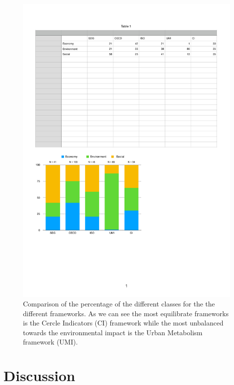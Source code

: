 \documentclass[preprint,12pt]{elsarticle}
\begin{document}
\begin{figure}[t!]
\centering
\includegraphics[width=1\textwidth]{figures/chart2.pdf}
\caption{Comparison of the percentage of the different classes for the the different frameworks. As we can see the most equilibrate frameworks is the Cercle Indicators (CI) framework while 
the most unbalanced towards the environmental impact is the Urban Metabolism framework (UMI).}
\label{fig:comparisonFramework}
\end{figure}








\section{Discussion}
\end{document}
